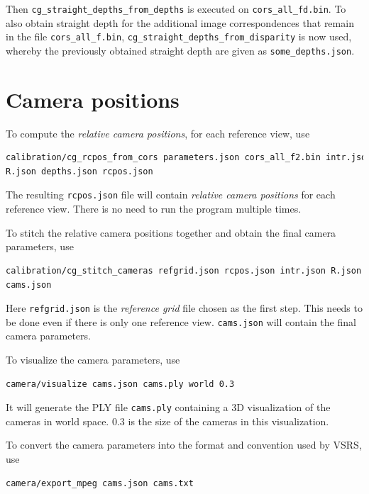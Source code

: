 \documentclass{scrreprt}
\begin{document}
Then \texttt{cg\_straight\_depths\_from\_depths} is executed on \texttt{cors\_all\_fd.bin}. To also obtain straight depth for the additional image correspondences that remain in the file \texttt{cors\_all\_f.bin}, \texttt{cg\_straight\_depths\_from\_disparity} is now used, whereby the previously obtained straight depth are given as \texttt{some\_depths.json}. 



\section{Camera positions}
To compute the \emph{relative camera positions}, for each reference view, use
\begin{lstlisting}[language=bash]
calibration/cg_rcpos_from_cors parameters.json cors_all_f2.bin intr.json
R.json depths.json rcpos.json
\end{lstlisting}

\noindent The resulting \texttt{rcpos.json} file will contain \emph{relative camera positions} for each reference view. There is no need to run the program multiple times.

To stitch the relative camera positions together and obtain the final camera parameters, use
\begin{lstlisting}[language=bash]
calibration/cg_stitch_cameras refgrid.json rcpos.json intr.json R.json
cams.json
\end{lstlisting}

\noindent Here \texttt{refgrid.json} is the \emph{reference grid} file chosen as the first step. This needs to be done even if there is only one reference view. \texttt{cams.json} will contain the final camera parameters.

To visualize the camera parameters, use
\begin{lstlisting}[language=bash]
camera/visualize cams.json cams.ply world 0.3
\end{lstlisting}

\noindent It will generate the PLY file \texttt{cams.ply} containing a 3D visualization of the cameras in world space. $0.3$ is the size of the cameras in this visualization.

To convert the camera parameters into the format and convention used by VSRS, use
\begin{lstlisting}[language=bash]
camera/export_mpeg cams.json cams.txt
\end{lstlisting}
\end{document}
